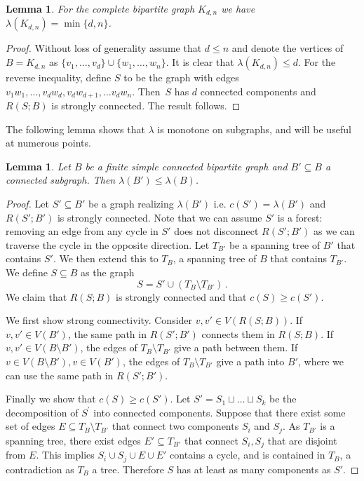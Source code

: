 \documentclass[11pt]{article}
\newtheorem{lemma}[theo]{Lemma}
\theoremstyle{definition}
\numberwithin{equation}{section}
\newcommand{\bddgraph}[2]{R(#1;#2)}
\begin{document}
\begin{lemma}\label{lem: recbipartite}
For the complete bipartite graph $K_{d,n}$ we have $\lambda(K_{d,n}) = \min\{d,n\}$.
\end{lemma}

\begin{proof}
Without loss of generality assume that $d \leq n$ and denote the vertices of $B = K_{d,n}$ as $\{v_1, \dots, v_d\} \cup \{w_1, \dots, w_n\}$.  It is clear that $\lambda(K_{d,n}) \leq d$. For the reverse inequality, define $S$ to be the graph with edges $v_1w_1, \dots, v_dw_d, v_dw_{d+1}, \dots v_dw_n$. Then~$S$ has $d$ connected components and $R(S;B)$ is strongly connected.  The result follows.
\end{proof}

The following lemma shows that $\lambda$ is monotone on subgraphs, and will be useful at numerous points.
\begin{lemma}\label{lem: lambda+monotone}
Let $B$ be a finite simple connected bipartite graph and $B' \subseteq B$ a connected subgraph.
Then $\lambda(B') \leq \lambda(B)$.
\end{lemma}
\begin{proof}
Let $S' \subseteq B'$ be a graph realizing $\lambda(B')$ i.e. $c(S') = \lambda(B')$ and $\bddgraph{S'}{B'}$ is strongly connected.
Note that we can assume $S'$ is a forest: removing an edge from any cycle in $S'$ does not disconnect $\bddgraph{S'}{B'}$ as we can traverse the cycle in the opposite direction.
Let $T_{B'}$ be a spanning tree of $B'$ that contains $S'$.
We then extend this to $T_B$, a spanning tree of $B$ that contains $T_{B'}$.
We define $S \subseteq B$ as the graph
\[
S = S' \cup \left(T_B \setminus T_{B'}\right) \, .
\]
We claim that $\bddgraph{S}{B}$ is strongly connected and that $c(S) \geq c(S')$.

We first show strong connectivity.
Consider $v, v' \in V(\bddgraph{S}{B})$.
If $v, v' \in V(B')$, the same path in $\bddgraph{S'}{B'}$ connects them in $\bddgraph{S}{B}$.
If $v, v' \in V(B \setminus B')$, the edges of $T_B \setminus T_{B'}$ give a path between them.
If $v \in V(B \setminus B'), v \in V(B')$, the edges of $T_B \setminus T_{B'}$ give a path into $B'$, where we can use the same path in $\bddgraph{S'}{B'}$.

Finally we show that $c(S) \geq c(S')$.
Let $S' = S_1 \sqcup \dots \sqcup S_k$ be the decomposition of $S^\prime$ into connected components.
Suppose that there exist some set of edges $E \subseteq T_B \setminus T_{B'}$ that connect two components $S_i$ and $S_j$.
As $T_{B'}$ is a spanning tree, there exist edges $E' \subseteq T_{B'}$ that connect $S_i, S_j$ that are disjoint from $E$.
This implies $S_i \cup S_j \cup E \cup E'$ contains a cycle, and is contained in $T_B$, a contradiction as $T_B$ a tree.
Therefore $S$ has at least as many components as $S'$.
\end{proof}
\end{document}
